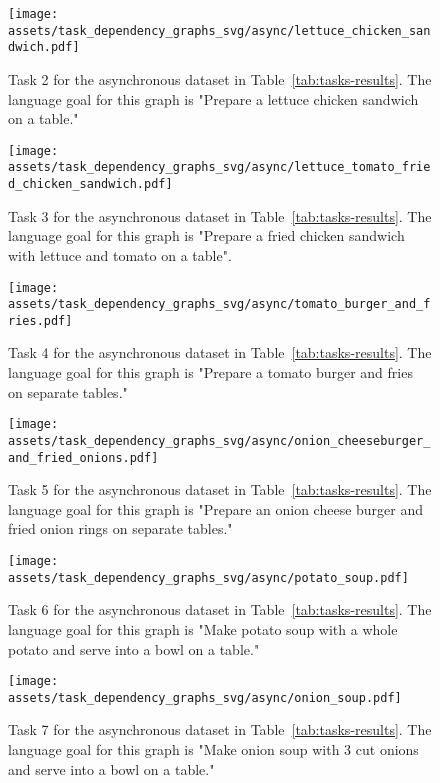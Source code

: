 \begin{figure}[H]
    \centering
    \texttt{[image: assets/task\_dependency\_graphs\_svg/async/lettuce\_chicken\_sandwich.pdf]}
    \caption{Task 2 for the asynchronous dataset in Table~\ref{tab:tasks-results}. The language goal for this graph is "Prepare a lettuce chicken sandwich on a table."}
    \label{fig:1_async}
\end{figure}

\begin{figure}[H]
    \centering
    \texttt{[image: assets/task\_dependency\_graphs\_svg/async/lettuce\_tomato\_fried\_chicken\_sandwich.pdf]}
    \caption{Task 3 for the asynchronous dataset in Table~\ref{tab:tasks-results}. The language goal for this graph is "Prepare a fried chicken sandwich with lettuce and tomato on a table".}
    \label{fig:2_async}
\end{figure}

\begin{figure}[H]
    \centering
    \texttt{[image: assets/task\_dependency\_graphs\_svg/async/tomato\_burger\_and\_fries.pdf]}
    \caption{Task 4 for the asynchronous dataset in Table~\ref{tab:tasks-results}. The language goal for this graph is "Prepare a tomato burger and fries on separate tables."}
    \label{fig:3_async}
\end{figure}

\begin{figure}[H]
    \centering
    \texttt{[image: assets/task\_dependency\_graphs\_svg/async/onion\_cheeseburger\_and\_fried\_onions.pdf]}
    \caption{Task 5 for the asynchronous dataset in Table~\ref{tab:tasks-results}. The language goal for this graph is "Prepare an onion cheese burger and fried onion rings on separate tables."}
    \label{fig:4_async}
\end{figure}

\begin{figure}[H]
    \centering
    \texttt{[image: assets/task\_dependency\_graphs\_svg/async/potato\_soup.pdf]}
    \caption{Task 6 for the asynchronous dataset in Table~\ref{tab:tasks-results}. The language goal for this graph is "Make potato soup with a whole potato and serve into a bowl on a table."}
    \label{fig:5_async}
\end{figure}

\begin{figure}[H]
    \centering
    \texttt{[image: assets/task\_dependency\_graphs\_svg/async/onion\_soup.pdf]}
    \caption{Task 7 for the asynchronous dataset in Table~\ref{tab:tasks-results}. The language goal for this graph is "Make onion soup with 3 cut onions and serve into a bowl on a table."}
    \label{fig:6_async}
\end{figure}

